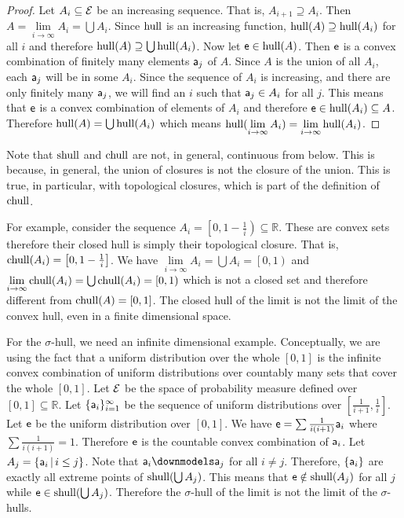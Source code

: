 \begin{mathSection}
\begin{proof}
	Let $A_i \subseteq \Ens$ be an increasing sequence. That is, $A_{i+1} \supseteq A_i$. Then $A = \lim\limits_{i \to \infty} A_i = \bigcup A_i$. Since $\hull$ is an increasing function, $\hull(A) \supseteq \hull(A_i)$ for all $i$ and therefore $\hull(A) \supseteq \bigcup \hull(A_i)$. Now let $\ens \in \hull(A)$. Then $\ens$ is a convex combination of finitely many elements $\ens[a]_j$ of $A$. Since $A$ is the union of all $A_i$, each $\ens[a]_j$ will be in some $A_i$. Since the sequence of $A_i$ is increasing, and there are only finitely many $\ens[a]_j$, we will find an $i$ such that $\ens[a]_j \in A_i$ for all $j$. This means that $\ens$ is a convex combination of elements of $A_i$ and therefore $\ens \in \hull(A_i) \subseteq A$. Therefore $\hull(A) = \bigcup \hull(A_i)$ which means $\hull(\lim\limits_{i \to \infty} A_i) = \lim\limits_{i \to \infty} \hull(A_i)$.
\end{proof}


\begin{remark}
	Note that $\shull$ and $\chull$ are not, in general, continuous from below. This is because, in general, the union of closures is not the closure of the union. This is true, in particular, with topological closures, which is part of the definition of $\chull$.
	
	For example, consider the sequence $A_i = \left[0, 1-\frac{1}{i}\right) \subseteq \mathbb{R}$. These are convex sets therefore their closed hull is simply their topological closure. That is, $\chull(A_i) = \left[0, 1-\frac{1}{i}\right]$. We have $\lim\limits_{i \to \infty} A_i = \bigcup A_i = \left[0, 1\right)$ and $\lim\limits_{i \to \infty} \chull(A_i) = \bigcup \chull(A_i) = \left[0, 1\right)$ which is not a closed set and therefore different from $\chull(A) = [0,1]$. The closed hull of the limit is not the limit of the convex hull, even in a finite dimensional space.
	
	For the $\sigma$-hull, we need an infinite dimensional example. Conceptually, we are using the fact that a uniform distribution over the whole $[0,1]$ is the infinite convex combination of uniform distributions over countably many sets that cover the whole $[0,1]$. Let $\Ens$ be the space of probability measure defined over $[0,1] \subseteq \mathbb{R}$. Let $\{\ens[a]_i\}_{i=1}^{\infty}$ be the sequence of uniform distributions over $\left[\frac{1}{i+1}, \frac{1}{i}\right]$. Let $\ens$ be the uniform distribution over $[0,1]$. We have $\ens = \sum \frac{1}{i(i+1)} \ens[a]_i$ where $\sum \frac{1}{i(i+1)} = 1$. Therefore $\ens$ is the countable convex combination of $\ens[a]_i$. Let $A_j = \{ \ens[a]_i \, | \, i \leq j\}$. Note that $\ens[a]_i \separate \ens[a]_j$ for all $i \neq j$. Therefore, $\{\ens[a]_i\}$ are exactly all extreme points of $\shull(\bigcup A_j)$. This means that $\ens \notin \shull(A_j)$ for all $j$ while $\ens \in \shull(\bigcup A_j)$. Therefore the $\sigma$-hull of the limit is not the limit of the $\sigma$-hulls.
\end{remark}



\end{mathSection}
